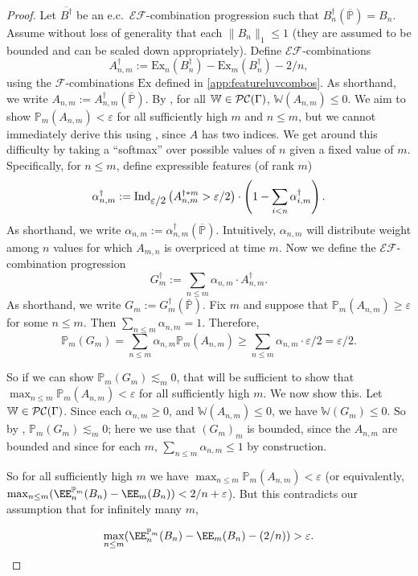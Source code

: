 \documentclass[authordate,onecolumn,noenvironments]{miri-tech-article}
\numberwithin{equation}{subsection}
\newcommand{\seq}[1]{{\overline{#1}}}
\newcommand{\ec}[1][\ ]{e.c.#1}
\newcommand{\features}{\mathcal{F}} %
\newcommand{\exfeatures}{\mathcal{E\!F}} %
\newcommand{\affluv}{B} %
\newcommand{\alta}{\mathrm{Ex}} %
\newcommand{\gens}{\dagger}
\newcommand{\gen}[1]{{#1^\gens}}
\newcommand{\BelState}{\mathbb{P}}
\newcommand{\pt}{\BelState}
\newcommand{\MP}{\seq{\pt}}
\newcommand{\ftn}{(\MP)} %
\newcommand{\cworlds}{\mathcal{P\-C}} %
\newcommand{\World}{\mathbb{W}}
\newcommand{\Theory}{\Gamma}
\newcommand{\ctsind}[1]{\operatorname{Ind}_{\text{\small{${#1}$}}}} %
\begin{document}
\begin{proof}
  Let $\seq{\gen\affluv}$ be an \ec $\exfeatures$-combination progression such that $\gen{\affluv_n} \ftn = \affluv_n$.
  Assume without loss of generality that each $\|\affluv_n\|_1 \leq 1$ (they are assumed to be bounded and can be scaled down appropriately).
  Define $\exfeatures$-combinations
  \[
    \gen{A_{n,m}} := \alta_n(\gen{\affluv_n}) - \alta_m(\gen{\affluv_n}) - 2/n, 
  \]
  using the $\features$-combinations $\alta$ defined in \ref{app:featureluvcombos}.
  As shorthand, we write $A_{n,m} := \gen{A_{n,m}} \ftn$.  By , for all $\World \in \cworlds(\Theory)$, $\World(A_{n, m}) \leq 0$.  
  We aim to show $\pt_m(A_{n, m}) < \varepsilon$ for all sufficiently high $m$ and $n \leq m$, but we cannot immediately
  derive this using , since $A$ has two indices.  We get around this difficulty
  by taking a ``softmax'' over possible values of $n$ given a fixed value of $m$.  Specifically, for $n \leq m$, define
  expressible features (of rank $m$)
  \[
    \gen{\alpha_{n,m}} := \ctsind{\varepsilon/2}\left(A_{n,m}^{\gens * m} > \varepsilon/2\right) \cdot \left(1 - \sum_{i < n} \gen{\alpha_{i,m}}\right).
  \]
  As shorthand, we write $\alpha_{n, m} := \gen{\alpha_{n,m}} \ftn$.  Intuitively, $\alpha_{n,m}$ will distribute weight among $n$ values for which $A_{m,n}$ is overpriced at time $m$.
  Now we define the $\exfeatures$-combination progression
  \[
    \gen{G_m} := \sum_{n \leq m} \alpha_{n,m} \cdot \gen{A_{n,m}}.
  \]
  As shorthand, we write $G_{m} := \gen{G_m} \ftn$.
  Fix $m$ and suppose that $\pt_m(A_{n,m}) \geq \varepsilon$ for some $n \leq m$.  Then $\sum_{n \leq m} \alpha_{n, m} = 1$.
  Therefore, 
  \[ \pt_m(G_m) = \sum_{n \leq m} \alpha_{n, m} \pt_m(A_{n,m}) \geq \sum_{n \leq m} \alpha_{n,m} \cdot \varepsilon / 2 = \varepsilon / 2. \]

  So if we can show $\pt_m(G_m) \lesssim_m 0$, that will be sufficient to show that $\max_{n \leq m} \pt_m(A_{n,m}) < \varepsilon$ for
  all sufficiently high $m$.  We now show this.
  Let $\World \in \cworlds(\Theory)$.
  Since each $\alpha_{n,m} \geq 0$, and $\World(A_{n,m}) \leq 0$, we have $\World(G_m) \leq 0$.  So by , $\pt_m(G_m) \lesssim_m 0$; here we use that $(G_m)_m$ is bounded, since the $A_{n,m}$ are bounded and since for each $m$, $\sum_{n \leq m} \alpha_{n, m} \leq  1$ by construction.

  So for all sufficiently high $m$ we have $\max_{n \leq m} \pt_m(A_{n,m}) < \varepsilon$ (or equivalently, $\max_{n \leq m} (\EE_n^{\pt_m}(\affluv_n) - \EE_m(\affluv_n)) < 2/n + \varepsilon$).  
  But this contradicts our assumption that for infinitely many $m$,

\[ \max_{n \leq m} (\EE_n^{\pt_m}(\affluv_n) - \EE_m(\affluv_n)-(2/n)) >  \varepsilon. \]

\end{proof}
\end{document}
